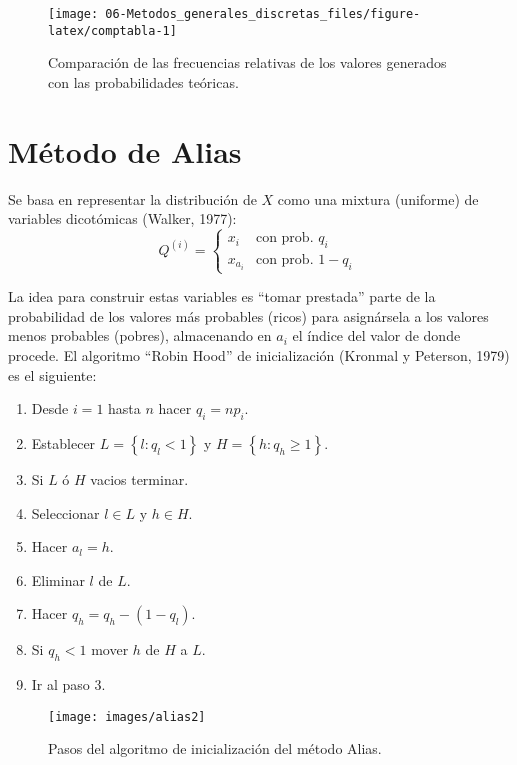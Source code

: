 \documentclass[
]{book}
\theoremstyle{break}
\theoremstyle{definition}
\theoremstyle{definition}
\theoremstyle{definition}
\theoremstyle{remark}
\begin{document}
\begin{figure}[!htb]

{\centering \texttt{[image: 06-Metodos\_generales\_discretas\_files/figure-latex/comptabla-1]} 

}

\caption{Comparación de las frecuencias relativas de los valores generados con las probabilidades teóricas.}\label{fig:comptabla}
\end{figure}

\hypertarget{alias}{%
\section{Método de Alias}\label{alias}}

Se basa en representar la distribución de \(X\) como una mixtura
(uniforme) de variables dicotómicas (Walker, 1977):
\[Q^{(i)}=\left\{ 
\begin{array}{ll}
x_{i} & \text{con prob. } q_{i} \\ 
x_{a_{i}} & \text{con prob. } 1-q_{i}
\end{array}
\ \right.\]

La idea para construir estas variables es ``tomar prestada'' parte de la probabilidad de los valores más probables (ricos) para asignársela a los valores menos probables (pobres), almacenando en \(a_i\) el índice del valor de donde procede.
El algoritmo ``Robin Hood'' de inicialización (Kronmal y Peterson, 1979) es el siguiente:

\begin{enumerate}
\def\labelenumi{\arabic{enumi}.}
\item
  Desde \(i=1\) hasta \(n\) hacer \(q_{i}=np_{i}\).
\item
  Establecer \(L=\left\{ l:q_{l}<1\right\}\) y
  \(H=\left\{ h:q_{h}\geq 1\right\}\).
\item
  Si \(L\) ó \(H\) vacios terminar.
\item
  Seleccionar \(l\in L\) y \(h\in H\).
\item
  Hacer \(a_{l}=h\).
\item
  Eliminar \(l\) de \(L\).
\item
  Hacer \(q_{h}=q_{h}-\left( 1-q_{l}\right)\).
\item
  Si \(q_{h}<1\) mover \(h\) de \(H\) a \(L\).
\item
  Ir al paso 3.
\end{enumerate}

\begin{figure}[!htb]

{\centering \texttt{[image: images/alias2]} 

}

\caption{Pasos del algoritmo de inicialización del método Alias.}\label{fig:unnamed-chunk-23}
\end{figure}
\end{document}
